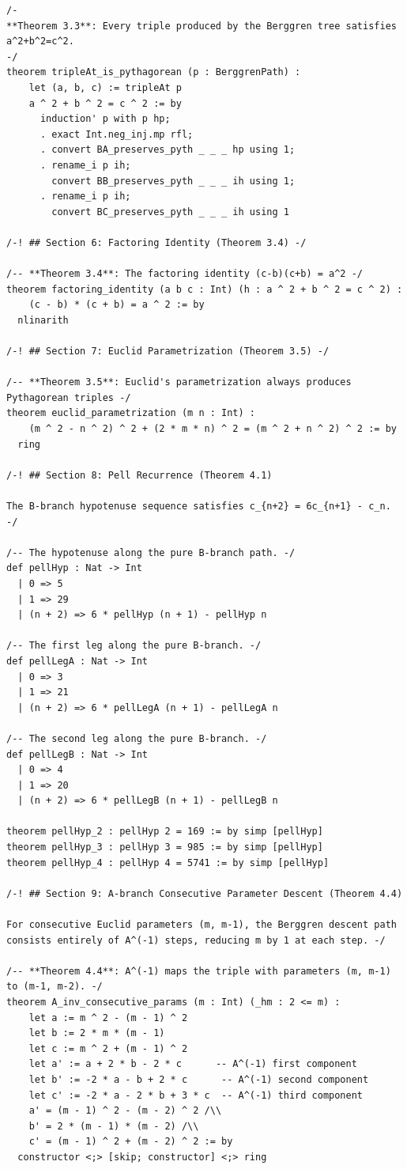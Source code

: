 \documentclass[11pt,openright,twoside]{book}
\theoremstyle{definition}
\begin{document}
\begin{lstlisting}[style=lean]
/-
**Theorem 3.3**: Every triple produced by the Berggren tree satisfies a^2+b^2=c^2.
-/
theorem tripleAt_is_pythagorean (p : BerggrenPath) :
    let (a, b, c) := tripleAt p
    a ^ 2 + b ^ 2 = c ^ 2 := by
      induction' p with p hp;
      . exact Int.neg_inj.mp rfl;
      . convert BA_preserves_pyth _ _ _ hp using 1;
      . rename_i p ih;
        convert BB_preserves_pyth _ _ _ ih using 1;
      . rename_i p ih;
        convert BC_preserves_pyth _ _ _ ih using 1

/-! ## Section 6: Factoring Identity (Theorem 3.4) -/

/-- **Theorem 3.4**: The factoring identity (c-b)(c+b) = a^2 -/
theorem factoring_identity (a b c : Int) (h : a ^ 2 + b ^ 2 = c ^ 2) :
    (c - b) * (c + b) = a ^ 2 := by
  nlinarith

/-! ## Section 7: Euclid Parametrization (Theorem 3.5) -/

/-- **Theorem 3.5**: Euclid's parametrization always produces Pythagorean triples -/
theorem euclid_parametrization (m n : Int) :
    (m ^ 2 - n ^ 2) ^ 2 + (2 * m * n) ^ 2 = (m ^ 2 + n ^ 2) ^ 2 := by
  ring

/-! ## Section 8: Pell Recurrence (Theorem 4.1)

The B-branch hypotenuse sequence satisfies c_{n+2} = 6c_{n+1} - c_n. -/

/-- The hypotenuse along the pure B-branch path. -/
def pellHyp : Nat -> Int
  | 0 => 5
  | 1 => 29
  | (n + 2) => 6 * pellHyp (n + 1) - pellHyp n

/-- The first leg along the pure B-branch. -/
def pellLegA : Nat -> Int
  | 0 => 3
  | 1 => 21
  | (n + 2) => 6 * pellLegA (n + 1) - pellLegA n

/-- The second leg along the pure B-branch. -/
def pellLegB : Nat -> Int
  | 0 => 4
  | 1 => 20
  | (n + 2) => 6 * pellLegB (n + 1) - pellLegB n

theorem pellHyp_2 : pellHyp 2 = 169 := by simp [pellHyp]
theorem pellHyp_3 : pellHyp 3 = 985 := by simp [pellHyp]
theorem pellHyp_4 : pellHyp 4 = 5741 := by simp [pellHyp]

/-! ## Section 9: A-branch Consecutive Parameter Descent (Theorem 4.4)

For consecutive Euclid parameters (m, m-1), the Berggren descent path
consists entirely of A^(-1) steps, reducing m by 1 at each step. -/

/-- **Theorem 4.4**: A^(-1) maps the triple with parameters (m, m-1) to (m-1, m-2). -/
theorem A_inv_consecutive_params (m : Int) (_hm : 2 <= m) :
    let a := m ^ 2 - (m - 1) ^ 2
    let b := 2 * m * (m - 1)
    let c := m ^ 2 + (m - 1) ^ 2
    let a' := a + 2 * b - 2 * c      -- A^(-1) first component
    let b' := -2 * a - b + 2 * c      -- A^(-1) second component
    let c' := -2 * a - 2 * b + 3 * c  -- A^(-1) third component
    a' = (m - 1) ^ 2 - (m - 2) ^ 2 /\\
    b' = 2 * (m - 1) * (m - 2) /\\
    c' = (m - 1) ^ 2 + (m - 2) ^ 2 := by
  constructor <;> [skip; constructor] <;> ring


\end{lstlisting}
\end{document}
